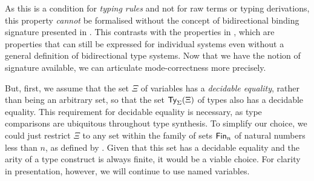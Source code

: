 As this is a condition for \emph{typing rules} and not for raw terms or typing derivations, this property \emph{cannot} be formalised without the concept of bidirectional binding signature presented in .
This contrasts with the properties in , which are properties that can still be expressed for individual systems even without a general definition of bidirectional type systems.
Now that we have the notion of signature available, we can articulate mode-correctness more precisely.

But, first, we assume that the set $\Xi$ of variables has a \emph{decidable equality}, rather than being an arbitrary set, so that the set $\mathsf{Ty}_{\Sigma}(\Xi)$ of types also has a decidable equality.
This requirement for decidable equality is necessary, as type comparisons are ubiquitous throughout type synthesis.
To simplify our choice, we could just restrict $\Xi$ to any set within the family of sets $\mathsf{Fin}_n$ of natural numbers less than $n$, as defined by \citet{Dybjer1994}.
Given that this set has a decidable equality and the arity of a type construct is always finite, it would be a viable choice.
For clarity in presentation, however, we will continue to use named variables.


